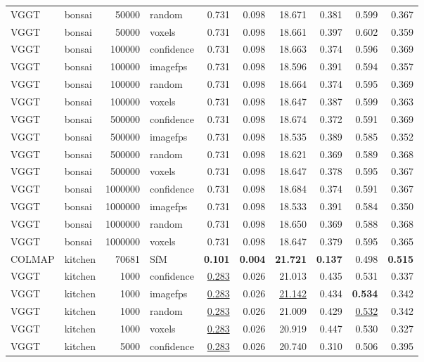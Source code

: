 \begin{table}[H]
\begin{tabular}{llrlrrrrrr}
VGGT & bonsai & 50000 & random & 0.731 & 0.098 & 18.671 & 0.381 & 0.599 & 0.367 \\
VGGT & bonsai & 50000 & voxels & 0.731 & 0.098 & 18.661 & 0.397 & 0.602 & 0.359 \\
VGGT & bonsai & 100000 & confidence & 0.731 & 0.098 & 18.663 & 0.374 & 0.596 & 0.369 \\
VGGT & bonsai & 100000 & imagefps & 0.731 & 0.098 & 18.596 & 0.391 & 0.594 & 0.357 \\
VGGT & bonsai & 100000 & random & 0.731 & 0.098 & 18.664 & 0.374 & 0.595 & 0.369 \\
VGGT & bonsai & 100000 & voxels & 0.731 & 0.098 & 18.647 & 0.387 & 0.599 & 0.363 \\
VGGT & bonsai & 500000 & confidence & 0.731 & 0.098 & 18.674 & 0.372 & 0.591 & 0.369 \\
VGGT & bonsai & 500000 & imagefps & 0.731 & 0.098 & 18.535 & 0.389 & 0.585 & 0.352 \\
VGGT & bonsai & 500000 & random & 0.731 & 0.098 & 18.621 & 0.369 & 0.589 & 0.368 \\
VGGT & bonsai & 500000 & voxels & 0.731 & 0.098 & 18.647 & 0.378 & 0.595 & 0.367 \\
VGGT & bonsai & 1000000 & confidence & 0.731 & 0.098 & 18.684 & 0.374 & 0.591 & 0.367 \\
VGGT & bonsai & 1000000 & imagefps & 0.731 & 0.098 & 18.533 & 0.391 & 0.584 & 0.350 \\
VGGT & bonsai & 1000000 & random & 0.731 & 0.098 & 18.650 & 0.369 & 0.588 & 0.368 \\
VGGT & bonsai & 1000000 & voxels & 0.731 & 0.098 & 18.647 & 0.379 & 0.595 & 0.365 \\
\midrule
COLMAP & kitchen & 70681 & SfM & \textbf{0.101} & \textbf{0.004} & \textbf{21.721} & \textbf{0.137} & 0.498 & \textbf{0.515} \\
VGGT & kitchen & 1000 & confidence & \underline{0.283} & 0.026 & 21.013 & 0.435 & 0.531 & 0.337 \\
VGGT & kitchen & 1000 & imagefps & \underline{0.283} & 0.026 & \underline{21.142} & 0.434 & \textbf{0.534} & 0.342 \\
VGGT & kitchen & 1000 & random & \underline{0.283} & 0.026 & 21.009 & 0.429 & \underline{0.532} & 0.342 \\
VGGT & kitchen & 1000 & voxels & \underline{0.283} & 0.026 & 20.919 & 0.447 & 0.530 & 0.327 \\
VGGT & kitchen & 5000 & confidence & \underline{0.283} & 0.026 & 20.740 & 0.310 & 0.506 & 0.395 \\

\end{tabular}
\end{table}
